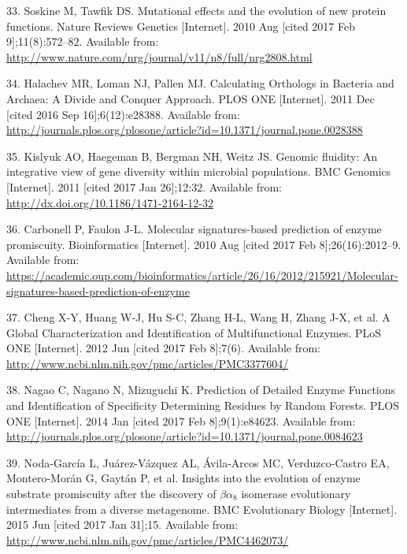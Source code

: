 \documentclass[12pt,twoside]{reedthesis}
\begin{document}
  \hypertarget{ref-soskine_mutational_2010}{}
  33. Soskine M, Tawfik DS. Mutational effects and the evolution of new
  protein functions. Nature Reviews Genetics {[}Internet{]}. 2010 Aug
  {[}cited 2017 Feb 9{]};11(8):572--82. Available from:
  \url{http://www.nature.com/nrg/journal/v11/n8/full/nrg2808.html}
  
  \hypertarget{ref-halachev_calculating_2011}{}
  34. Halachev MR, Loman NJ, Pallen MJ. Calculating Orthologs in Bacteria
  and Archaea: A Divide and Conquer Approach. PLOS ONE {[}Internet{]}.
  2011 Dec {[}cited 2016 Sep 16{]};6(12):e28388. Available from:
  \url{http://journals.plos.org/plosone/article?id=10.1371/journal.pone.0028388}
  
  \hypertarget{ref-kislyuk_genomic_2011}{}
  35. Kislyuk AO, Haegeman B, Bergman NH, Weitz JS. Genomic fluidity: An
  integrative view of gene diversity within microbial populations. BMC
  Genomics {[}Internet{]}. 2011 {[}cited 2017 Jan 26{]};12:32. Available
  from: \url{http://dx.doi.org/10.1186/1471-2164-12-32}
  
  \hypertarget{ref-carbonell_molecular_2010}{}
  36. Carbonell P, Faulon J-L. Molecular signatures-based prediction of
  enzyme promiscuity. Bioinformatics {[}Internet{]}. 2010 Aug {[}cited
  2017 Feb 8{]};26(16):2012--9. Available from:
  \url{https://academic.oup.com/bioinformatics/article/26/16/2012/215921/Molecular-signatures-based-prediction-of-enzyme}
  
  \hypertarget{ref-cheng_global_2012}{}
  37. Cheng X-Y, Huang W-J, Hu S-C, Zhang H-L, Wang H, Zhang J-X, et al. A
  Global Characterization and Identification of Multifunctional Enzymes.
  PLoS ONE {[}Internet{]}. 2012 Jun {[}cited 2017 Feb 8{]};7(6). Available
  from: \url{http://www.ncbi.nlm.nih.gov/pmc/articles/PMC3377604/}
  
  \hypertarget{ref-nagao_prediction_2014}{}
  38. Nagao C, Nagano N, Mizuguchi K. Prediction of Detailed Enzyme
  Functions and Identification of Specificity Determining Residues by
  Random Forests. PLOS ONE {[}Internet{]}. 2014 Jan {[}cited 2017 Feb
  8{]};9(1):e84623. Available from:
  \url{http://journals.plos.org/plosone/article?id=10.1371/journal.pone.0084623}
  
  \hypertarget{ref-noda-garcia_insights_2015}{}
  39. Noda-García L, Juárez-Vázquez AL, Ávila-Arcos MC, Verduzco-Castro
  EA, Montero-Morán G, Gaytán P, et al. Insights into the evolution of
  enzyme substrate promiscuity after the discovery of \(\beta\alpha_8\)
  isomerase evolutionary intermediates from a diverse metagenome. BMC
  Evolutionary Biology {[}Internet{]}. 2015 Jun {[}cited 2017 Jan
  31{]};15. Available from:
  \url{http://www.ncbi.nlm.nih.gov/pmc/articles/PMC4462073/}
  
\end{document}
